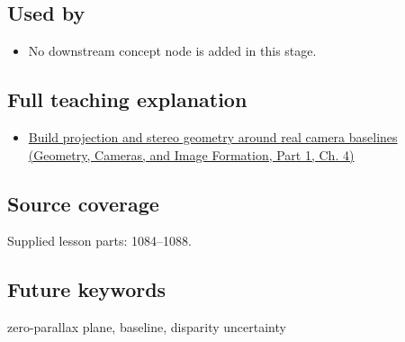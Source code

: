 \subsection{Used by}\label{appendix-0976e86e5b9f-used-by}

\hypertarget{appendix-0976e86e5b9f-used-by}{}

\begin{itemize}
\tightlist
\item
  No downstream concept node is added in this stage.
\end{itemize}

\subsection{Full teaching explanation}\label{appendix-0976e86e5b9f-full-teaching-explanation}

\hypertarget{appendix-0976e86e5b9f-full-teaching-explanation}{}

\begin{itemize}
\tightlist
\item
  \href{../03-Geometry-Cameras-and-Image-Formation-P01/main.pdf\#02-foundations-ii-ch035-build-projection-and-stereo-geometry-around-real-camera-baselines}{Build projection and stereo geometry around real camera baselines (Geometry, Cameras, and Image Formation, Part 1, Ch. 4)}
\end{itemize}

\subsection{Source coverage}\label{appendix-0976e86e5b9f-source-coverage}

\hypertarget{appendix-0976e86e5b9f-source-coverage}{}

Supplied lesson parts: 1084--1088.

\subsection{Future keywords}\label{appendix-0976e86e5b9f-future-keywords}

\hypertarget{appendix-0976e86e5b9f-future-keywords}{}

zero-parallax plane, baseline, disparity uncertainty
